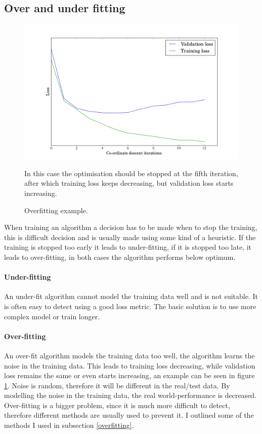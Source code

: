 \documentclass[12pt,a4paper]{book}
\newcommand\note[1]{\vspace*{-0.5\baselineskip}\caption*{#1}}
\begin{document}
\subsection{Over and under fitting}
\begin{figure}[ht]
\centering
\includegraphics[scale=0.5]{overfitting}
\caption{Overfitting example.}
\note{In this case the optimisation should be stopped at the fifth iteration, after which training loss keeps decreasing, but validation loss starts increasing.}
\label{fig:overfitting}
\end{figure}
When training an algorithm a decision has to be made when to stop the training, this is difficult decision and is usually made using some kind of a heuristic.
If the training is stopped too early it leads to under-fitting, if it is stopped too late, it leads to over-fitting, in both cases the algorithm performs below optimum.
\paragraph{Under-fitting}
An under-fit algorithm cannot model the training data well and is not suitable.
It is often easy to detect using a good loss metric.
The basic solution is to use more complex model or train longer.
\paragraph{Over-fitting}
An over-fit algorithm models the training data too well, the algorithm learns the noise in the training data.
This leads to training loss decreasing, while validation loss remains the same or even starts increasing, an example can be seen in figure \ref{fig:overfitting}.
Noise is random, therefore it will be different in the real/test data.
By modelling the noise in the training data, the real world-performance is decreased.
Over-fitting is a bigger problem, since it is much more difficult to detect, therefore different methods are usually used to prevent it.
I outlined some of the methods I used in subsection \ref{overfitting}.
\end{document}
